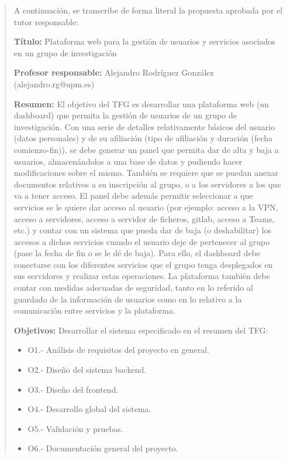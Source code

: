 \documentclass[11pt,a4paper]{article}
\begin{document}
\begin{quote}
A continuación, se transcribe de forma literal la propuesta aprobada por el tutor responsable:

\textbf{Título:} Plataforma web para la gestión de usuarios y servicios asociados en un grupo de investigación 

\textbf{Profesor responsable:} Alejandro Rodríguez González (alejandro.rg@upm.es) 

\textbf{Resumen:} 
El objetivo del TFG es desarrollar una plataforma web (un dashboard) que permita la gestión de usuarios de un grupo de investigación. Con una serie de detalles relativamente básicos del usuario (datos personales) y de su afiliación (tipo de afiliación y duración (fecha comienzo-fin)), se debe generar un panel que permita dar de alta y baja a usuarios, almacenándolos a una base de datos y pudiendo hacer modificaciones sobre el mismo. También se requiere que se puedan anexar documentos relativos a su inscripción al grupo, o a los servidores a los que va a tener acceso.
El panel debe además permitir seleccionar a que servicios se le quiere dar acceso al usuario (por ejemplo: acceso a la VPN, acceso a servidores, acceso a servidor de ficheros, gitlab, acceso a Teams, etc.) y contar con un sistema que pueda dar de baja (o deshabilitar) los accesos a dichos servicios cuando el usuario deje de pertenecer al grupo (pase la fecha de fin o se le dé de baja). Para ello, el dashboard debe conectarse con los diferentes servicios que el grupo tenga desplegados en sus servidores y realizar estas operaciones.
La plataforma también debe contar con medidas adecuadas de seguridad, tanto en lo referido al guardado de la información de usuarios como en lo relativo a la comunicación entre servicios y la plataforma.

\textbf{Objetivos:}
Desarrollar el sistema especificado en el resumen del TFG:

\begin{itemize}
    \item O1.- Análisis de requisitos del proyecto en general.
    \item O2.- Diseño del sistema backend.
    \item O3.- Diseño del frontend.
    \item O4.- Desarrollo global del sistema.
    \item O5.- Validación y pruebas.
    \item O6.- Documentación general del proyecto. 
\end{itemize}


\end{quote}
\end{document}
